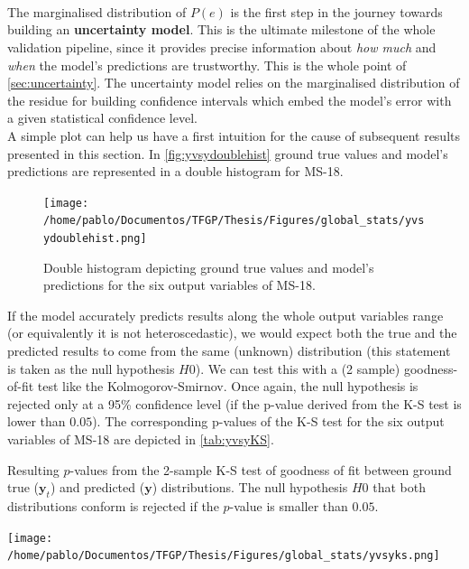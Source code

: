 \paragraph{ \\}
The marginalised distribution of $P(e)$ is the first step in the journey towards building an \textbf{uncertainty model}. This is the ultimate milestone of the whole validation pipeline, since it provides precise information about \textit{how much} and \textit{when} the model's predictions are trustworthy. This is the whole point of \autoref{sec:uncertainty}. The uncertainty model relies on the marginalised distribution of the residue for building confidence intervals which embed the model's error with a given statistical confidence level.\\
%
\indent A simple plot can help us have a first intuition for the cause of subsequent results presented in this section. In \autoref{fig:yvsydoublehist} ground true values and model's predictions are represented in a double histogram for MS-18.\\
\begin{figure}
	\centering
	\texttt{[image: /home/pablo/Documentos/TFGP/Thesis/Figures/global\_stats/yvsydoublehist.png]}
	\caption{Double histogram depicting ground true values and model's predictions for the six output variables of MS-18.}
	\label{fig:yvsydoublehist}
\end{figure}
%
\indent If the model accurately predicts results along the whole output variables range (or equivalently it is not heteroscedastic), we would expect both the true and the predicted results to come from the same (unknown) distribution (this statement is taken as the null hypothesis $H0$). We can test this with a (2 sample) goodness-of-fit test like the Kolmogorov-Smirnov. Once again, the null hypothesis is rejected only at a 95\% confidence level (\ie if the p-value derived from the K-S test is lower than $0.05$). The corresponding p-values of the K-S test for the six output variables of MS-18 are depicted in \autoref{tab:yvsyKS}.\\
\begin{table}
	\centering
	\caption{Resulting $p$-values from the 2-sample K-S test of goodness of fit between ground true ($\mathbf{y}_t$) and predicted ($\mathbf{{y}}$) distributions. The null hypothesis $H0$ that both distributions conform is rejected if the $p$-value is smaller than $0.05$.}
	\texttt{[image: /home/pablo/Documentos/TFGP/Thesis/Figures/global\_stats/yvsyks.png]}
	\label{tab:yvsyKS}
\end{table}

